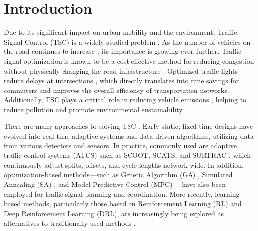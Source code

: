 \chapter*{Introduction}

%
%
%
%

Due to its significant impact on urban mobility and the environment, Traffic Signal Control (TSC) is a widely studied problem \cite{zhao2012computational}. As the number of vehicles on the road continues to increase \cite{caves2004encyclopedia}, its importance is growing even further.
Traffic signal optimization is known to be a cost-effective method for reducing congestion without physically changing the road infrastructure \cite{wang2021traffic}.
Optimized traffic lights reduce delays at intersections \cite{mu2022traffic}, which directly translates into time savings for commuters and improves the overall efficiency of transportation networks.
Additionally, TSC plays a critical role in reducing vehicle emissions \cite{gunarathne2023traffic}, helping to reduce pollution and promote environmental sustainability.

There are many approaches to solving TSC \cite{qadri2020state}. Early static, fixed-time designs have evolved into real-time adaptive systems and data-driven algorithms, utilizing data from various detectors and sensors. In practice, commonly used are adaptive traffic control systems (ATCS) such as SCOOT, SCATS, and SURTRAC \cite{smith2013surtrac}, which continuously adjust splits, offsets, and cycle lengths network-wide. In addition, optimization-based methods---such as Genetic Algorithm (GA) \cite{costa2020intersection}, Simulated Annealing (SA) \cite{qadri2020state}, and Model Predictive Control (MPC) \cite{ye2019survey}---have also been employed for traffic signal planning and coordination. More recently, learning-based methods, particularly those based on Reinforcement Learning (RL) and Deep Reinforcement Learning (DRL), are increasingly being explored as alternatives to traditionally used methods \cite{zhao2024survey, saadi2025survey}.

